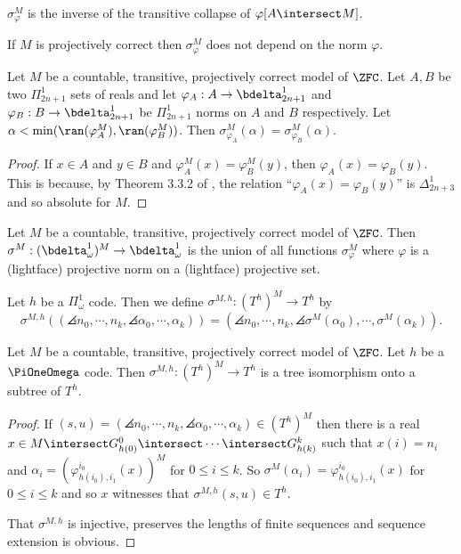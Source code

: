 \documentclass[oneside,12pt]{amsart}
\begin{document}
$\sigma^M_{\varphi}$ is the inverse of the transitive collapse of
$\varphi[A\intersect M]$.

If $M$ is projectively correct then $\sigma^M_{\varphi}$ does not depend on the norm $\varphi$.

\begin{lemma}
Let $M$ be a countable, transitive, projectively correct model of $\ZFC$.
Let $A,B$ be two $\Pi^1_{2n+1}$ sets of reals and let $\varphi_A:A\to\bdelta^1_{2n+1}$
and $\varphi_B:B\to\bdelta^1_{2n+1}$ be $\Pi^1_{2n+1}$ norms on $A$ and $B$ respectively.
Let $\alpha < \min(\ran(\varphi^M_A),\ran(\varphi^M_B))$. Then
$\sigma^M_{\varphi_A}(\alpha) = \sigma^M_{\varphi_B}(\alpha)$.
\end{lemma}
\begin{proof}
If $x\in A$ and $y\in B$ and $\varphi^M_A(x) = \varphi^M_B(y)$, then
$\varphi_A(x)=\varphi_B(y)$. This is because,
by Theorem 3.3.2 of \cite{HarringtonKechris}, the relation
``$\varphi_A(x)=\varphi_B(y)$'' is $\Delta^1_{2n+3}$ and so absolute for $M$.
\end{proof}


\begin{definition}
\label{norm_embedding_def}
Let $M$ be a countable, transitive, projectively correct model of $\ZFC$.
Then $\sigma^M:(\bdelta^1_{\omega})^M\to\bdelta^1_{\omega}$ is the union of all
functions $\sigma^M_{\varphi}$ where $\varphi$ is a (lightface) projective norm on a
(lightface) projective set.

Let $h$ be a $\Pi^1_{\omega}$ code. Then we define
$\sigma^{M,h}:(T^h)^M\to T^h$ by
$$\sigma^{M,h}\left( (\angles{n_0,\cdots, n_k}, \angles{\alpha_0, \cdots, \alpha_k}  ) \right) =
(\angles{n_0,\cdots, n_k}, \angles{\sigma^M(\alpha_0), \cdots, \sigma^M(\alpha_k)}  ).$$
\end{definition}

\begin{lemma}
\label{tree_embedding_lemma}
Let $M$ be a countable, transitive, projectively correct model of $\ZFC$.
Let $h$ be a $\PiOneOmega$ code.
Then $\sigma^{M,h}:(T^h)^M\to T^h$ is a tree isomorphism
onto a subtree of $T^h$.
\end{lemma}
\begin{proof}
If $(s,u) = (\angles{n_0,\cdots, n_k}, \angles{\alpha_0, \cdots, \alpha_k}  ) \in (T^h)^M$
then there is a real $x\in M \intersect G^0_{h(0)} \intersect \cdots \intersect G^k_{h(k)}$ such
that $x(i)=n_i$ and $\alpha_i=(\varphi^{i_0}_{h(i_0),i_1}(x))^M$  for $0\leq i \leq k$.
So $\sigma^M(\alpha_i) = \varphi^{i_0}_{h(i_0),i_1}(x)$ for $0\leq i \leq k$ and so
$x$ witnesses that  $\sigma^{M,h}(s,u)\in T^h$.

That $\sigma^{M,h}$ is injective, preserves the lengths of finite sequences and sequence extension
is obvious.
\end{proof}
\end{document}
